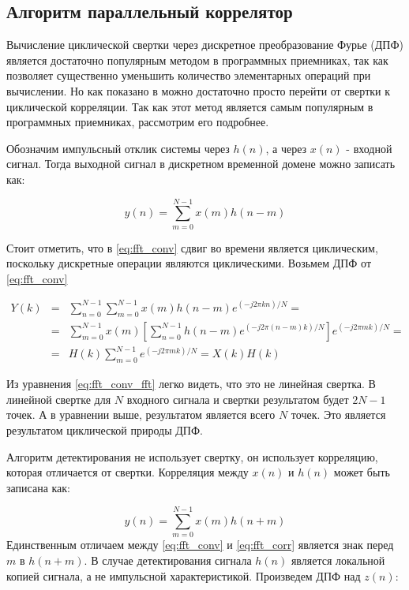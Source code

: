 \subsection{Алгоритм параллельный коррелятор}
\label{sec1_fft}

Вычисление циклической свертки через дискретное преобразование Фурье (ДПФ) является достаточно популярным методом
в программных приемниках, так как позволяет существенно 
уменьшить количество элементарных операций при вычислении. Но как показано в \cite{tsui, oppenheim} можно достаточно просто
перейти от свертки к циклической корреляции. Так как этот метод является самым популярным в программных приемниках, рассмотрим его
подробнее.

Обозначим импульсный отклик системы через $h(n)$, а через ${x(n)}$ - входной сигнал. Тогда выходной сигнал в дискретном
временной домене можно записать как:

\begin{equation}
	\label{eq:fft_conv}
	y(n)=\sum\limits_{m=0}^{N-1}{x(m)h(n-m)}
\end{equation}

Стоит отметить, что в \ref{eq:fft_conv} сдвиг во времени является циклическим, поскольку дискретные операции являются циклическими.
Возьмем ДПФ от \ref{eq:fft_conv}

\begin{center}
\begin{eqnarray}
	\label{eq:fft_conv_fft}
	Y(k) & = & \sum\limits_{n=0}^{N-1}\sum\limits_{m=0}^{N-1}{x(m)h(n-m)e^{(-j2\pi{kn})/N}}=\nonumber \\
	& = & \sum\limits_{m=0}^{N-1}{x(m)}[\sum\limits_{n=0}^{N-1}h(n-m)e^{(-j2\pi{(n-m)}k)/N}]e^{(-j2\pi{m}k)/N}=\\
	& = & H(k)\sum\limits_{m=0}^{N-1}e^{(-j2\pi{m}k)/N} = X(k)H(k)\nonumber 
\end{eqnarray}
\end{center}


Из уравнения \ref{eq:fft_conv_fft} легко видеть, что это не линейная свертка. В линейной свертке для $N$ входного
сигнала и свертки результатом будет $2N-1$ точек. А в уравнении выше, результатом является всего $N$ точек.
Это является результатом циклической природы ДПФ.

Алгоритм детектирования не использует свертку, он использует корреляцию, которая отличается от свертки. Корреляция
между $x(n)$ и $h(n)$ может быть записана как:

\begin{equation}
	\label{eq:fft_corr}
	y(n) = \sum\limits_{m=0}^{N-1}{x(m)h(n+m)}
\end{equation}
Единственным отличаем между \ref{eq:fft_conv} и \ref{eq:fft_corr} является знак перед $m$ в ${h(n+m)}$.
В случае детектирования сигнала $h(n)$ является локальной копией сигнала, а не импульсной характеристикой.
Произведем ДПФ над $z(n)$:

